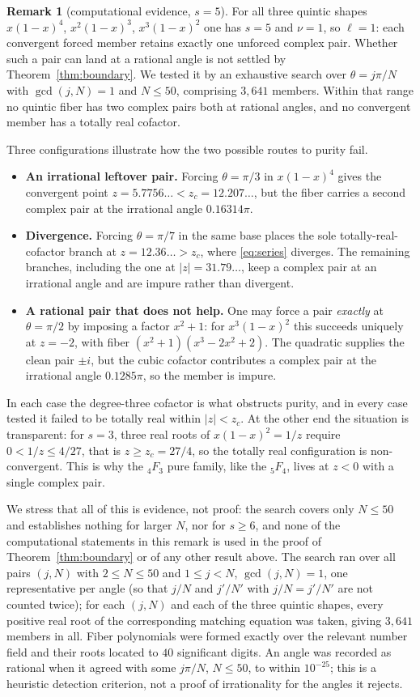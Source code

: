 \documentclass[11pt]{article}
\theoremstyle{definition}
\newtheorem{remark}[theorem]{Remark}
\begin{document}
\begin{remark}[computational evidence, $s=5$]
For all three quintic shapes $x(1-x)^4$, $x^2(1-x)^3$, $x^3(1-x)^2$ one has $s=5$ and
$\nu=1$, so $\ell=1$: each convergent forced member retains exactly one
unforced complex pair. Whether such a pair can land at a rational angle is not settled by
Theorem~\ref{thm:boundary}. We tested it by an exhaustive search over $\theta=j\pi/N$ with
$\gcd(j,N)=1$ and $N\le50$, comprising $3{,}641$ members. Within that range no quintic fiber has two
complex pairs both at rational angles, and no convergent member has a totally real cofactor.

Three configurations illustrate how the two possible routes to purity fail.
\begin{itemize}
\item \textbf{An irrational leftover pair.} Forcing $\theta=\pi/3$ in $x(1-x)^4$ gives the convergent
point $z=5.7756\ldots<z_c=12.207\ldots$, but the fiber carries a second complex pair at the
irrational angle $0.16314\pi$.
\item \textbf{Divergence.} Forcing $\theta=\pi/7$ in the same base places the sole
totally-real-cofactor branch at $z=12.36\ldots>z_c$, where \eqref{eq:series} diverges. The remaining
branches, including the one at $|z|=31.79\ldots$, keep a complex pair at an irrational angle and are
impure rather than divergent.
\item \textbf{A rational pair that does not help.} One may force a pair \emph{exactly} at
$\theta=\pi/2$ by imposing a factor $x^2+1$: for $x^3(1-x)^2$ this succeeds uniquely at $z=-2$, with
fiber $(x^2+1)(x^3-2x^2+2)$. The quadratic supplies the clean pair $\pm i$, but the cubic cofactor
contributes a complex pair at the irrational angle $0.1285\pi$, so the member is impure.
\end{itemize}
In each case the degree-three cofactor is what obstructs purity, and in every case tested it failed
to be totally real within $|z|<z_c$. At the other end the situation is transparent: for $s=3$, three
real roots of $x(1-x)^2=1/z$ require $0<1/z\le4/27$, that is $z\ge z_c=27/4$, so the totally real
configuration is non-convergent. This is why the ${}_4F_3$ pure family, like the ${}_5F_4$, lives at
$z<0$ with a single complex pair.

We stress that all of this is evidence, not proof: the search covers only $N\le50$ and establishes
nothing for larger $N$, nor for $s\ge6$, and none of the computational statements in this remark is
used in the proof of Theorem~\ref{thm:boundary} or of any other result above. The search ran over all pairs $(j,N)$ with $2\le N\le50$ and $1\le j<N$, $\gcd(j,N)=1$, one
representative per angle (so that $j/N$ and $j'/N'$ with $j/N=j'/N'$ are not counted twice); for each
$(j,N)$ and each of the three quintic shapes, every positive real root of the corresponding matching
equation was taken, giving $3{,}641$ members in all. Fiber polynomials were formed exactly over the
relevant number field and their roots located to $40$ significant digits. An angle was recorded as
rational when it agreed with some $j\pi/N$, $N\le50$, to within $10^{-25}$; this is a heuristic
detection criterion, not a proof of irrationality for the angles it rejects.
\end{remark}
\end{document}
